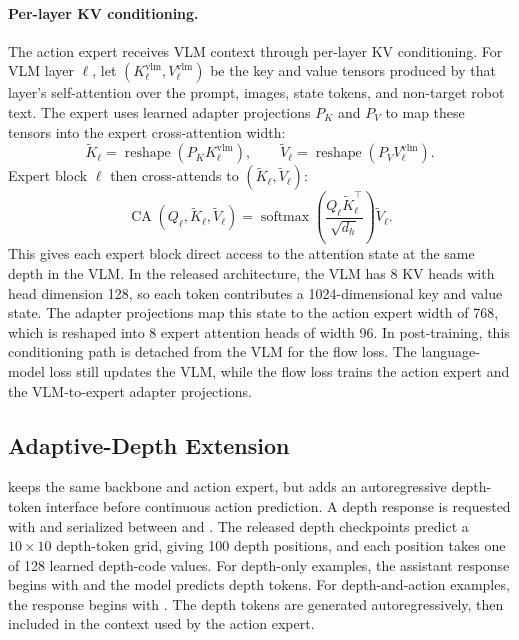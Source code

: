 \paragraph{Per-layer KV conditioning.}
The action expert receives VLM context through per-layer KV conditioning. For
VLM layer \(\ell\), let \((K^{\mathrm{vlm}}_\ell,V^{\mathrm{vlm}}_\ell)\) be
the key and value tensors produced by that layer's self-attention over the
prompt, images, state tokens, and non-target robot text. The expert uses learned
adapter projections \(P_K\) and \(P_V\) to map these tensors into the expert
cross-attention width:
\begin{equation}
    \tilde{K}_\ell =
    \operatorname{reshape}\!\left(P_K K^{\mathrm{vlm}}_\ell\right),
    \qquad
    \tilde{V}_\ell =
    \operatorname{reshape}\!\left(P_V V^{\mathrm{vlm}}_\ell\right).
\end{equation}
Expert block \(\ell\) then cross-attends to
\((\tilde{K}_\ell,\tilde{V}_\ell)\):
\begin{equation}
    \operatorname{CA}(Q_\ell,\tilde{K}_\ell,\tilde{V}_\ell)
    =
    \operatorname{softmax}\!\left(
        \frac{Q_\ell \tilde{K}_\ell^\top}{\sqrt{d_h}}
    \right)\tilde{V}_\ell .
\end{equation}
This gives each expert block direct access to the attention state at the same
depth in the VLM. In the released architecture, the VLM has 8 KV heads with
head dimension 128, so each token contributes a 1024-dimensional key and value
state. The adapter projections map this state to the action expert width of
768, which is reshaped into 8 expert attention heads of width 96. In
post-training, this conditioning path is detached from the VLM for the flow
loss. The language-model loss still updates the VLM, while the flow loss trains
the action expert and the VLM-to-expert adapter projections.

\subsection{Adaptive-Depth Extension}
\label{supp:model-depth}

\molmothink keeps the same backbone and action expert, but adds an
autoregressive depth-token interface before continuous action prediction. A
depth response is requested with \texttt{} and
serialized between \texttt{} and
\texttt{}. The released depth checkpoints predict a
\(10\times10\) depth-token grid, giving 100 depth positions, and each position
takes one of 128 learned depth-code values. For depth-only examples, the
assistant response begins with
\texttt{} and the model predicts depth tokens. For
depth-and-action examples, the response begins with
\texttt{}. The depth tokens are
generated autoregressively, then included in the context used by the action
expert.


